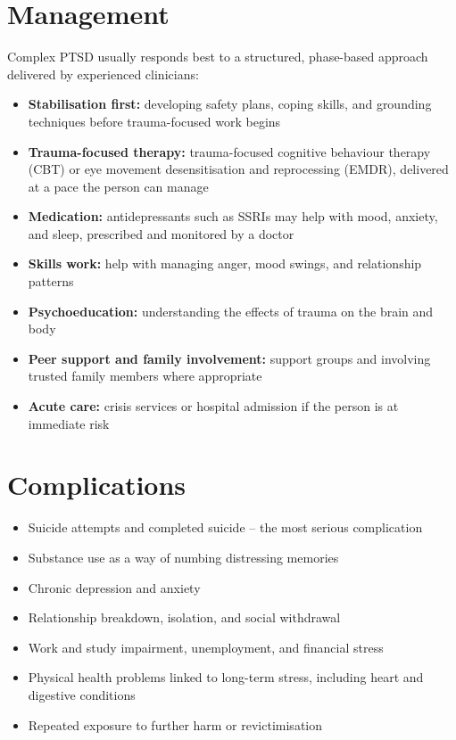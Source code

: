 \section*{Management}
Complex PTSD usually responds best to a structured, phase-based approach delivered by experienced clinicians:

\begin{itemize}
    \item \textbf{Stabilisation first:} developing safety plans, coping skills, and grounding techniques before trauma-focused work begins
    \item \textbf{Trauma-focused therapy:} trauma-focused cognitive behaviour therapy (CBT) or eye movement desensitisation and reprocessing (EMDR), delivered at a pace the person can manage
    \item \textbf{Medication:} antidepressants such as SSRIs may help with mood, anxiety, and sleep, prescribed and monitored by a doctor
    \item \textbf{Skills work:} help with managing anger, mood swings, and relationship patterns
    \item \textbf{Psychoeducation:} understanding the effects of trauma on the brain and body
    \item \textbf{Peer support and family involvement:} support groups and involving trusted family members where appropriate
    \item \textbf{Acute care:} crisis services or hospital admission if the person is at immediate risk
\end{itemize}

\section*{Complications}
\begin{itemize}
    \item Suicide attempts and completed suicide -- the most serious complication
    \item Substance use as a way of numbing distressing memories
    \item Chronic depression and anxiety
    \item Relationship breakdown, isolation, and social withdrawal
    \item Work and study impairment, unemployment, and financial stress
    \item Physical health problems linked to long-term stress, including heart and digestive conditions
    \item Repeated exposure to further harm or revictimisation
\end{itemize}

